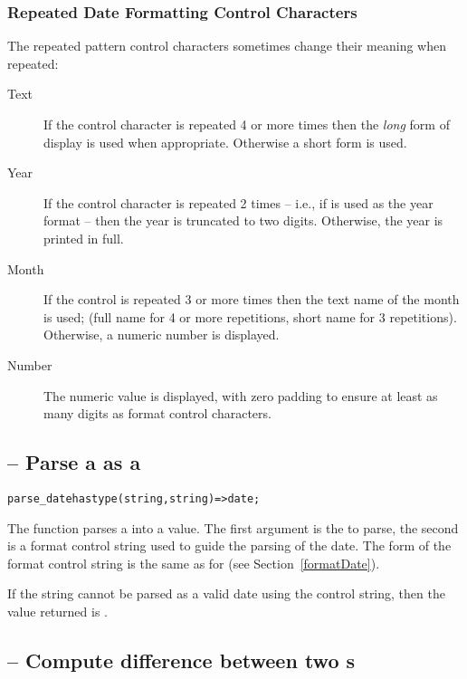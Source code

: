 {\subsubsection{Repeated Date Formatting Control Characters}
The repeated pattern control characters sometimes change their meaning when repeated:
\begin{description}
\item[Text] If the control character is repeated 4 or more times then the \emph{long} form of display is used when appropriate. Otherwise a short form is used.
\item[Year] If the control character is repeated 2 times -- i.e., if  is used as the year format -- then the year is truncated to two digits. Otherwise, the year is printed in full.
\item[Month] If the  control is repeated 3 or more times then the text name of the month is used; (full name for 4 or more repetitions, short name for 3 repetitions). Otherwise, a numeric number is displayed.
\item[Number] The numeric value is displayed, with zero padding to ensure at least as many digits as format control characters.
\end{description}

\subsection{ -- Parse a  as a }
\label{parseDate}

\begin{alltt}
parse\_date has type (string,string)=>date;
\end{alltt}

The  function parses a  into a  value. The first argument is the  to parse, the second is a format control string used to guide the parsing of the date. The form of the format control string is the same as for  (see Section~\vref{formatDate}).

If the string cannot be parsed as a valid date using the control string, then the value returned is .


\subsection{ -- Compute difference between two s}
\label{timeDiff}

}
